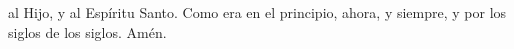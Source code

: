 al Hijo, y al Espíritu Santo. Como era en el principio, ahora, y siempre, y por los siglos de los siglos. Amén.